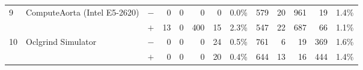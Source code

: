 \begin{tabular}{lll | rrrrr | rrrrr }
\hline
\multirow{ 2}{*}{9} & \multirow{ 2}{*}{ComputeAorta (Intel E5-2620)} & $-$ & 0 & 0 & 0 & 0 & 0.0\%       & 579 & 20 & 961 & 19 & 1.4\% \\& & $+$ & 13 & 0 & 400 & 15 & 2.3\% & 547 & 22 & 687 & 66 & 1.1\% \\
\hline
\multirow{ 2}{*}{10} & \multirow{ 2}{*}{Oclgrind Simulator} & $-$ & 0 & 0 & 0 & 24 & 0.5\%       & 761 & 6 & 19 & 369 & 1.6\% \\& & $+$ & 0 & 0 & 0 & 20 & 0.4\% & 644 & 13 & 16 & 444 & 1.4\% \\
  \bottomrule
\end{tabular}

